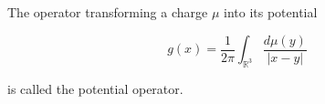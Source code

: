 The operator transforming a charge $\mu$ into its potential

$$g(x) = \frac{1}{2\pi} \int_{\mathbb{R}^3} \frac{d\mu(y)}{|x - y|}$$

is called the potential operator.
